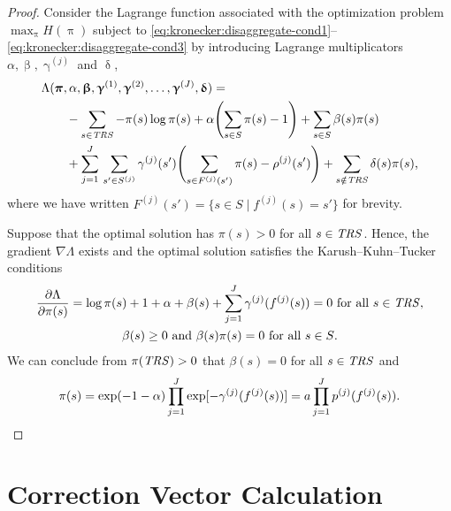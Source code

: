 \documentclass[a4paper,10pt,twoside,openright]{memoir}
\renewcommand*{\vec}[1]{\boldsymbol{\mathrm{#1}}}
\newcommand*{\TRS}{\textnormal{\emph{TRS}}}
\begin{document}
\begin{proof}
  Consider the Lagrange function associated with the optimization
  problem $\max_{\vec{\uppi}} H(\vec{\uppi})$ subject to
  \eqref{eq:kronecker:disaggregate-cond1}--%
  \eqref{eq:kronecker:disaggregate-cond3} by introducing Lagrange
  multiplicators $\alpha, \vec{\upbeta}, \vec{\upgamma}^{(j)}$ and
  $\vec{\updelta}$,
  \begin{equation}
    \begin{aligned}
      & \Lambda(\vec{\pi}, \alpha, \vec{\upbeta},
      \vec{\upgamma}^{(1)}, \vec{\upgamma}^{(2)}, \ldots,
      \vec{\upgamma}^{(J)},
      \vec{\updelta}) =\\
      &\qquad - \sum_{s \in \TRS} - \pi(s) \log \pi(s) + \alpha
      \Biggl( \sum_{s \in S} \pi(s) - 1 \Biggr) + \sum_{s \in S}
      \beta(s) \pi(s) \\
      &\qquad + \sum_{j = 1}^{J} \, \sum_{s' \in S^{(j)}}
      \gamma^{(j)}(s') \Biggl( \sum_{s \in F^{(j)}(s')} \pi(s) -
      \rho^{(j)}(s') \Biggr) + \sum_{s \notin \TRS} \delta(s) \pi(s)
      \text,
    \end{aligned}
  \end{equation}
  where we have written $F^{(j)}(s') = \{ s \in S \mid f^{(j)}(s) = s'
  \}$ for brevity.

  Suppose that the optimal solution has $\pi(s) > 0$ for all
  $s \in \TRS$. Hence, the gradient $\nabla \Lambda$ exists and the
  optimal solution satisfies the Karush--Kuhn--Tucker conditions
  \begin{gather}
    \frac{\partial \Lambda}{\partial \pi(s)}
    = \log \pi(s) + 1 + \alpha + \beta(s) + \sum_{j = 1}^{J}
    \gamma^{(j)}(f^{(j)}(s)) = 0 \text{ for all $s \in \TRS$,} \\
    \beta(s) \ge 0 \text{ and } \beta(s) \pi(s) = 0 \text{ for all $s
      \in S$.}
  \end{gather}
  We can conclude from $\pi(\TRS) > 0$ that $\beta(s) = 0$ for all
  $s \in \TRS$ and
  \begin{equation}
    \pi(s) = \exp (-1 - \alpha) \prod_{j = 1}^J \exp
    [ -\gamma^{(j)}(f^{(j)}(s)) ]
    = a \prod_{j = 1}^J p^{(j)}(f^{(j)}(s)) \text.
  \end{equation}
\end{proof}

\section{Correction Vector Calculation}
\end{document}
